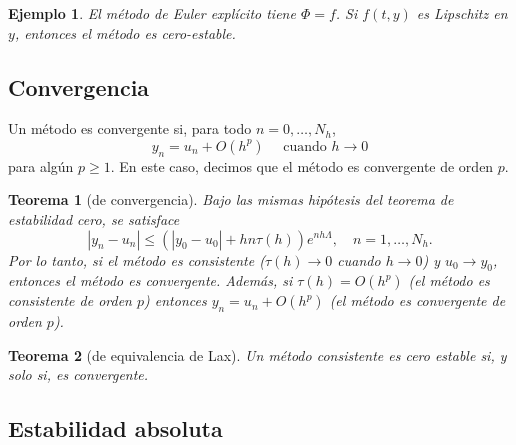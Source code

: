 \documentclass[11pt,letterpaper]{report}
\newtheorem{example}{Ejemplo}
\newtheorem{theorem}{Teorema}
\begin{document}
\begin{example}
  El método de Euler explícito tiene $\Phi=f$. Si $f(t,y)$ es
  Lipschitz en $y$, entonces el método es cero-estable.
\end{example}

\subsection{Convergencia}

Un método es convergente si, para todo $n=0,\dots,N_h$,
\begin{equation}
  y_n = u_n + O(h^p) \quad \text{ cuando } h\to 0
\end{equation}
para algún $p\geq 1$. En este caso, decimos que el método es
convergente de orden $p$.

\begin{theorem}[de convergencia]
  Bajo las mismas hipótesis del teorema de estabilidad cero, se
  satisface
  \begin{equation}
    |y_n-u_n| \leq (|y_0-u_0|+hn\tau(h))e^{nh\Lambda},
    \quad n=1,\dots,N_h
  .\end{equation}
  Por lo tanto, si el método es consistente ($\tau(h)\to 0$ cuando
  $h\to 0$) y $u_0\to y_0$, entonces el método es convergente.
  Además, si $\tau(h)=O(h^{p})$ (el método es consistente de orden
  $p$) entonces $y_n = u_n + O(h^p)$ (el método es convergente de
  orden $p$).
\end{theorem}

\begin{theorem}[de equivalencia de Lax]
  Un método consistente es cero estable si, y solo si, es
  convergente.
\end{theorem}

\subsection{Estabilidad absoluta}
\end{document}

